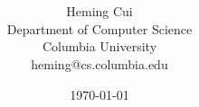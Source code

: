 \documentclass[12pt]{article}
\title{
\bf \mytitle}
\author{ {Heming Cui}  \\
Department of Computer Science \\
Columbia University\\
{\small heming@cs.columbia.edu}
}
\date{\today}
\begin{document}
\pagestyle{plain}
\maketitle

\pagebreak
\begin{abstract}

\end{abstract}

\pagebreak
\tableofcontents
\pagebreak

\cleardoublepage
{}













\begin{footnotesize}


\end{footnotesize}
\end{document}
